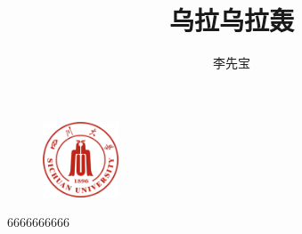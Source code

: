 \documentclass[aspectratio=169]{beamer} %
\title{乌拉乌拉轰} %
\author{李先宝} %
\institute[Sichuan University]{Sichuan University} %
\date{} %
\begin{document}
\begin{frame}
    \titlepage
    \begin{figure}
        \centering
        \includegraphics[width=0.2\textwidth]{pic/sculogo.png}
    \end{figure}
\end{frame}


\begin{frame}
    6666666666
\end{frame}
\end{document}
